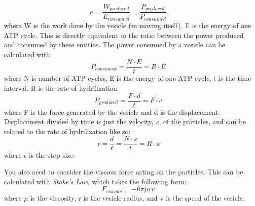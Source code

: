\begin{equation}
e = \frac{W_{produced}}{E_{consumed}} = \frac{P_{produced}}{P_{consumed}}
\end{equation}
where W is the work done by the vesicle (in moving itself), E is the energy of one ATP cycle.
This is directly equivalent to the ratio between the power produced and consumed by these entities.
The power consumed by a vesicle can be calculated with
\begin{equation}
P_{consumed} = \frac{N \cdot E}{t} = R \cdot E
\end{equation}
where N is number of ATP cycles, E is the energy of one ATP cycle, t is the time interval. R is the rate of hydrilization.
\begin{equation}
P_{produced} = \frac{F \cdot d}{t} = F \cdot v
\end{equation}
where F is the force generated by the vesicle and d is the displacement.
Displacement divided by time is just the velocity, $v$, of the particles, and can be related to the rate of hydrilization like so:
\begin{equation}
v = \frac{d}{t} = \frac{N \cdot s}{t} = R \cdot s
\end{equation}
where s is the step size.
\par
You also need to consider the viscous force acting on the particles. This can be calculated with \emph{Stoke's Law}, which takes the following form:
\begin{equation}
F_{viscous} = -6 \pi \mu r v
\end{equation}
where $\mu$ is the viscosity, r is the vesicle radius, and v is the speed of the vesicle.

